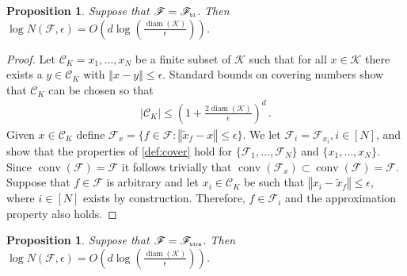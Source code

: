 \documentclass[letter, 12pt]{report}
\newcommand{\pr}{\text{\tiny\texttt{r}}}
\newcommand{\pb}{\text{\tiny\texttt{b}}}
\newcommand{\pl}{\text{\tiny\texttt{l}}}
\renewcommand{\pm}{\text{\tiny\texttt{m}}}
\newcommand{\norm}[1]{\left \Vert  #1 \right \Vert}
\newcommand{\cK}{\mathcal K}
\newcommand{\cC}{\mathcal C}
\newcommand{\sF}{\mathscr F}
\newcommand{\conv}{\operatorname{conv}}
\newcommand{\diam}{\operatorname{diam}}
\newcommand{\1}{\mathbf{1}}
\theoremstyle{plain}
\newtheorem{proposition}[theorem]{Proposition}
\theoremstyle{definition}
\theoremstyle{remark}
\begin{document}
\begin{proposition}\label{prop:N}
    Suppose that $\sF = \sF_{\pb\pl}$. Then $\log N(\sF, \epsilon) = O\left(d \log\left(\frac{\diam(\cK)}{\epsilon}\right)\right)$.
\end{proposition}
\begin{proof}
    Let $\cC_K={x_1, \ldots, x_N}$ be a finite subset of $\cK$ such that for all $x \in \cK$ there exists a $y \in \cC_K$ with $\norm{x - y} \leq \epsilon$.
    Standard bounds on covering numbers \citep[\S4]{ASG15} show that $\cC_K$ can be chosen so that
    \begin{align*}
        |\cC_K| \leq \left(1 + \frac{2\diam(\cK)}{\epsilon}\right)^d \,.
    \end{align*}
    Given $x \in \cC_K$ define $\sF_x = \{f \in \sF : \norm{\tilde x_f - x} \leq \epsilon\}$.
    We let $\sF_i = \sF_{x_i}, i \in [N]$,
    and show that the properties of \cref{def:cover} hold for $\{\sF_1,\ldots,\sF_N\}$ and $\{x_1, \ldots, x_N\}$.
    Since $\conv(\sF) = \sF$ it follows trivially that $\conv(\sF_x) \subset \conv(\sF) = \sF$.
    Suppose that $f \in \sF$ is arbitrary and let $x_i \in \cC_K$ be such that $\norm{x_i - \tilde x_f} \leq \epsilon$, where $i\in[N]$ exists by construction.
    Therefore, $f \in \sF_i$ and the approximation property also holds.
\end{proof}

\begin{proposition}\label{prop:N-ridge}
    Suppose that $\sF = \sF_{\pb\pl\pr\pm}$. Then $\log N(\sF, \epsilon) = O\left(d \log\left(\frac{\diam(\cK)}{\epsilon}\right)\right)$.
\end{proposition}
\end{document}
